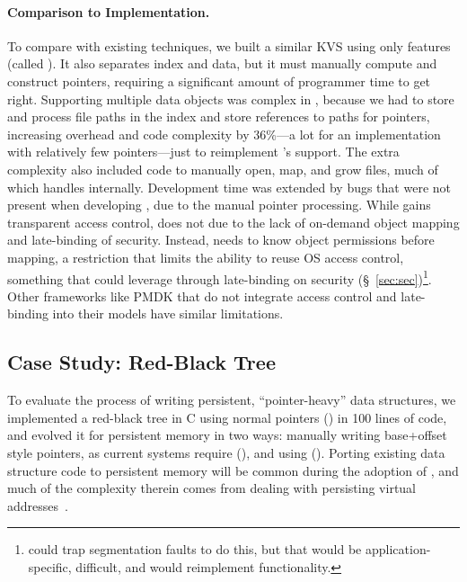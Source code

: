 {    \paragraph{Comparison to \unix Implementation.} To compare with existing techniques, we built a
    similar KVS using only \unix features (called \unixkv). It also separates index and data, but it
    must manually compute and construct pointers, requiring a significant amount of programmer time to
    get right.
    Supporting multiple data objects was complex in \unixkv, because we had to store and process file
    paths in the index and store references to paths for pointers, increasing overhead and code
    complexity by 36\%---a lot for an implementation with relatively few pointers---just to reimplement
    \Twizzler's support. The extra complexity also included code to manually open, map, and
    grow files, much of which \Twizzler handles internally. Development time was extended by
    bugs that were not present when developing \nvkv, due to the manual pointer processing.  While \nvkv
    gains transparent access control, \unixkv does not due to the lack of
    on-demand object mapping and late-binding of security. Instead, \unixkv needs to know object permissions before
    mapping,
    a restriction that limits the ability to reuse OS access control, something that
    \nvkv could leverage through late-binding on security (\S~\ref{sec:sec})\footnote{\unixkv could trap segmentation faults to do this, but that would be
        application-specific, difficult, and would reimplement \Twizzler functionality.}. Other frameworks like PMDK
    that do not integrate access control and late-binding into their models have similar
    limitations.


    \subsection{Case Study: Red-Black Tree}
    To evaluate the process of writing persistent, ``pointer-heavy'' data
    structures,
    we implemented a red-black tree in C using normal pointers (\ramrbt)
    in 100 lines of code,
    and evolved it for persistent memory in two ways: manually writing
    base+offset style pointers, as current systems require (\unixrbt),
    and using \Twizzler (\nvrbt).
    Porting existing data structure code to persistent memory
    will be common during the adoption of \NVM, and much of the complexity therein
    comes from dealing with persisting virtual addresses~\cite{virendra:hotstorage17}.

}
